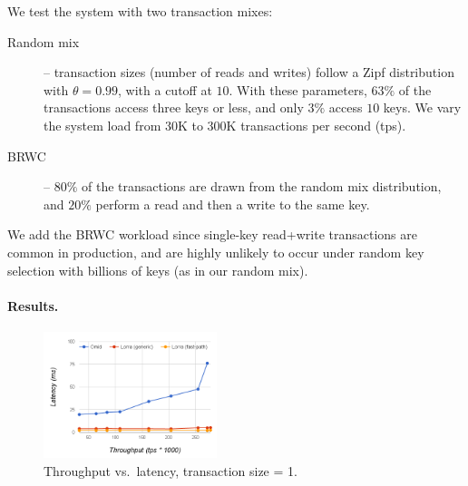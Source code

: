 We test the system with two transaction mixes:
\begin{description}
\item[Random mix] -- 
transaction sizes (number of reads and writes) follow a Zipf distribution with $\theta=0.99$, with a cutoff at $10$. 
With these parameters, $63\%$ of the transactions access three keys or less, and only $3\%$ access $10$ keys. 
We vary the system load from 30K to 300K transactions per second (tps). 
\item[BRWC] -- $80\%$ of the transactions are drawn from the random mix distribution, and $20\%$ perform a read
and then a write to the same key. 
\end{description}

We add the BRWC workload since single-key read+write transactions are common in production, and are highly unlikely to 
occur under random key selection with billions of keys (as in our random mix).

\paragraph{Results.} 

\begin{figure}[t]
\centering
	\includegraphics[width=0.45\textwidth]{figs/thpt-latency-1.png}
	\caption{Throughput vs.\ latency, transaction size = 1.}
  \label{fig:tl-1}
\end{figure}

